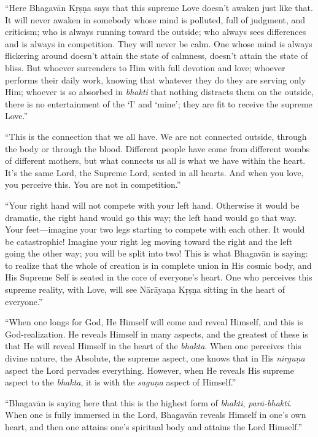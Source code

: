 \enquote{Here Bhagavān Kṛṣṇa says that this supreme Love doesn’t awaken just like that. It will never awaken in somebody whose mind is polluted, full of judgment, and criticism; who is always running toward the outside; who always sees differences and is always in competition. They will never be calm. One whose mind is always flickering around doesn’t attain the state of calmness, doesn’t attain the state of bliss. But whoever surrenders to Him with full devotion and love; whoever performs their daily work, knowing that whatever they do they are serving only Him; whoever is so absorbed in \textit{bhakti} that nothing distracts them on the outside, there is no entertainment of the \enquote{I} and \enquote{mine}; they are fit to receive the supreme Love.}

\enquote{This is the connection that we all have. We are not connected outside, through the body or through the blood. Different people have come from different wombs of different mothers, but what connects us all is what we have within the heart. It’s the same Lord, the Supreme Lord, seated in all hearts. And when you love, you perceive this. You are not in competition.}

\enquote{Your right hand will not compete with your left hand. Otherwise it would be dramatic, the right hand would go this way; the left hand would go that way. Your feet---imagine your two legs starting to compete with each other. It would be catastrophic! Imagine your right leg moving toward the right and the left going the other way; you will be split into two! This is what Bhagavān is saying: to realize that the whole of creation is in complete union in His cosmic body, and His Supreme Self is seated in the core of everyone’s heart. One who perceives this supreme reality, with Love, will see Nārāyaṇa Kṛṣṇa sitting in the heart of everyone.}

\enquote{When one longs for God, He Himself will come and reveal Himself, and this is God-realization. He reveals Himself in many aspects, and the greatest of these is that He will reveal Himself in the heart of the \textit{bhakta}. When one perceives this divine nature, the Absolute, the supreme aspect, one knows that in His \textit{nirguṇa} aspect the Lord pervades everything. However, when He reveals His supreme aspect to the \textit{bhakta}, it is with the \textit{saguṇa} aspect of Himself.}

\enquote{Bhagavān is saying here that this is the highest form of \textit{bhakti}, \textit{parā-bhakti}. When one is fully immersed in the Lord, Bhagavān reveals Himself in one’s own heart, and then one attains one’s spiritual body and attains the Lord Himself.}

